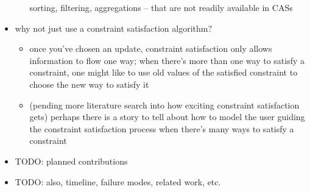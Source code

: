 \documentclass{article}
\begin{document}
\begin{itemize}
\begin{itemize}
                sorting, filtering, aggregations -- that are not readily
                available in CASs
        \end{itemize}
    \item why not just use a constraint satisfaction algorithm?
        \begin{itemize}
            \item once you've chosen an update, constraint satisfaction only
                allows information to flow one way; when there's more than
                one way to satisfy a constraint, one might like to use old
                values of the satisfied constraint to choose the new way to
                satisfy it
            \item (pending more literature search into how exciting
                constraint satisfaction gets) perhaps there is a story to
                tell about how to model the user guiding the constraint
                satisfaction process when there's many ways to satisfy a
                constraint
        \end{itemize}
    \item TODO: planned contributions
    \item TODO: also, timeline, failure modes, related work, etc.
\end{itemize}
\end{document}
